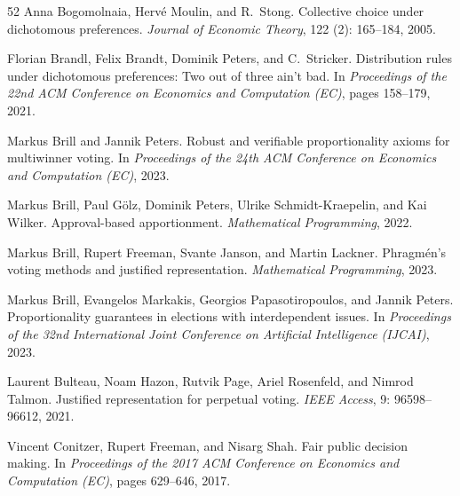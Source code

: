 \documentclass[10pt]{scrartcl}
\theoremstyle{plain}
\theoremstyle{definition}
\begin{document}
\begin{thebibliography}{52}
	Anna Bogomolnaia, Herv{\'e} Moulin, and R.~Stong.
	\newblock Collective choice under dichotomous preferences.
	\newblock \emph{Journal of Economic Theory}, 122 (2):
	165--184, 2005.
	
	Florian Brandl, Felix Brandt, Dominik Peters, and C.~Stricker.
	\newblock Distribution rules under dichotomous preferences: {T}wo out of three
	ain't bad.
	\newblock In \emph{Proceedings of the 22nd ACM Conference on Economics and
		Computation (EC)}, pages 158--179, 2021.
	
	Markus Brill and Jannik Peters.
	\newblock Robust and verifiable proportionality axioms for multiwinner voting.
	\newblock In \emph{Proceedings of the 24th ACM Conference on Economics and
		Computation (EC)}, 2023.
	
	Markus Brill, Paul G{\"o}lz, Dominik Peters, Ulrike Schmidt-Kraepelin, and Kai
	Wilker.
	\newblock Approval-based apportionment.
	\newblock \emph{Mathematical Programming}, 2022.
	
	Markus Brill, Rupert Freeman, Svante Janson, and Martin Lackner.
	\newblock Phragm{\'e}n's voting methods and justified representation.
	\newblock \emph{Mathematical Programming}, 2023{}.
	
	Markus Brill, Evangelos Markakis, Georgios Papasotiropoulos, and Jannik Peters.
	\newblock Proportionality guarantees in elections with interdependent issues.
	\newblock In \emph{Proceedings of the 32nd International Joint Conference on
		Artificial Intelligence (IJCAI)}, 2023{}.
	
	Laurent Bulteau, Noam Hazon, Rutvik Page, Ariel Rosenfeld, and Nimrod Talmon.
	\newblock Justified representation for perpetual voting.
	\newblock \emph{IEEE Access}, 9: 96598--96612, 2021.
	
	Vincent Conitzer, Rupert Freeman, and Nisarg Shah.
	\newblock Fair public decision making.
	\newblock In \emph{Proceedings of the 2017 ACM Conference on Economics and
		Computation (EC)}, pages 629--646, 2017.
	

\end{thebibliography}
\end{document}
